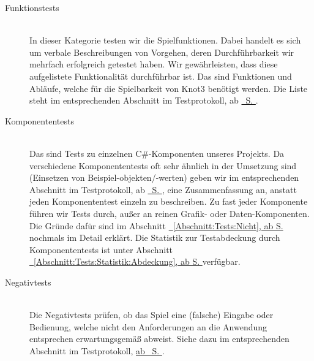 \begin{description}



	\item[Funktionstests] \hfill
	\\
	
	In dieser Kategorie testen wir die Spielfunktionen. Dabei handelt es sich um verbale Beschreibungen von Vorgehen, deren Durchführbarkeit wir mehrfach erfolgreich getestet haben. Wir gewährleisten, dass diese aufgelistete Funktionalität durchführbar ist. Das sind Funktionen und Abläufe, welche für die Spielbarkeit von Knot3 benötigt werden. Die Liste steht im entsprechenden Abschnitt im Testprotokoll, ab \hyperref[Abschnitt:Tests:Protokoll:Funktion]{\mousecursor~S. \pageref{Abschnitt:Tests:Protokoll:Funktion}}.\\


	
	\item[Komponententests] \hfill
	\\
	
	Das sind Tests zu einzelnen C\#-Komponenten unseres Projekts. Da verschiedene Komponententests oft sehr ähnlich in der Umsetzung sind (Einsetzen von Beispiel-objekten/-werten) geben wir im entsprechenden Abschnitt im Testprotokoll, ab \hyperref[Abschnitt:Tests:Protokoll:Komponenten]{\mousecursor~S. \pageref{Abschnitt:Tests:Protokoll:Komponenten}}, eine Zusammenfassung an, anstatt jeden Komponententest einzeln zu beschreiben.
	Zu fast jeder Komponente führen wir Tests durch, außer an reinen Grafik- oder Daten-Komponenten. Die Gründe dafür sind im Abschnitt \hyperref[Abschnitt:Tests:Nicht]{\mousecursor~\ref{Abschnitt:Tests:Nicht}, ab S. \pageref{Abschnitt:Tests:Nicht}} nochmals im Detail erklärt. Die Statistik zur Testabdeckung durch Komponententests ist unter Abschnitt \hyperref[Abschnitt:Tests:Statistik:Abdeckung]{\mousecursor~\ref{Abschnitt:Tests:Statistik:Abdeckung}, ab S. \pageref{Abschnitt:Tests:Statistik:Abdeckung}} verfügbar.\\


\clearpage



	\item[Negativtests] \hfill
	\\
	
	Die Negativtests prüfen, ob das Spiel eine (falsche) Eingabe oder Bedienung, welche nicht den Anforderungen an die Anwendung entsprechen erwartungsgemäß abweist. Siehe dazu im entsprechenden Abschnitt im Testprotokoll, \hyperref[Abschnitt:Tests:Protokoll:Negativ]{ab \mousecursor~S. \pageref{Abschnitt:Tests:Protokoll:Negativ}}.\\
		


\end{description}
